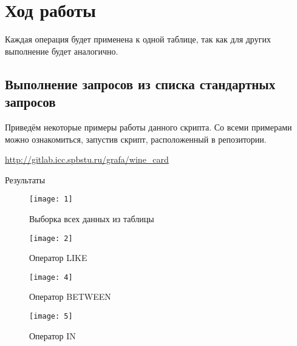 \section{Ход работы}
Каждая операция будет применена к одной таблице, так как для других выполнение
будет аналогично.

\subsection{Выполнение запросов из списка стандартных запросов}


\parindent=1cm %

Приведём некоторые примеры работы данного скрипта.
Со всеми примерами можно ознакомиться, запустив скрипт, расположенный в репозитории.

\href{http://gitlab.icc.spbstu.ru/grafa/wine_card}{http://gitlab.icc.spbstu.ru/grafa/wine\_card}

\newpage
\large{Результаты}

\begin{figure}[H]
	\begin{center}
		\texttt{[image: 1]}
		\caption{Выборка всех данных из таблицы} 
		\label{pic:1} %
	\end{center}
\end{figure}

\begin{figure}[H]
	\begin{center}
		\texttt{[image: 2]}
		\caption{Оператор LIKE} 
		\label{pic:2} %
	\end{center}
\end{figure}

\begin{figure}[H]
	\begin{center}
		\texttt{[image: 4]}
		\caption{Оператор BETWEEN} 
		\label{pic:4} %
	\end{center}
\end{figure}

\begin{figure}[H]
	\begin{center}
		\texttt{[image: 5]}
		\caption{Оператор IN} 
		\label{pic:5} %
	\end{center}
\end{figure}

